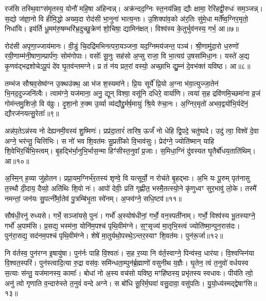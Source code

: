 रज॑सि तस्थि॒वाꣳस॑मृ॒तस्य॒ योनौ॑ महि॒षा अ॑हिन्वन्न्। अक्र॑न्दद॒ग्निः स्त॒नय॑न्निव॒ द्यौः क्षामा॒ रेरि॑हद्वी॒रुधः॑ सम॒ञ्जन्न्। स॒द्यो ज॑ज्ञा॒नो वि हीमि॒द्धो अख्य॒दा रोद॑सी भा॒नुना॑ भात्य॒न्तः। उ॒शिक्पा॑व॒को अ॑र॒तिः सु॑मे॒धा मर्ते᳚ष्व॒ग्निर॒मृतो॒ निधा॑यि। इय॑र्ति धू॒मम॑रु॒षम्भरि॑भ्र॒दुच्छु॒क्रेण॑ शो॒चिषा॒ द्यामिन॑क्षत्। विश्व॑स्य के॒तुर्भुव॑नस्य॒ गर्भ॒ आ॥७॥

रोद॑सी अपृणा॒ज्जाय॑मानः। वी॒डुं चि॒दद्रि॑मभिनत्परा॒यञ्जना॒ यद॒ग्निमय॑जन्त॒ पञ्च॑। श्री॒णामु॑दा॒रो ध॒रुणो॑ रयी॒णाम्म॑नी॒षाणा॒म्प्रार्प॑णः॒ सोम॑गोपाः। वसोः᳚ सू॒नुः सह॑सो अ॒प्सु राजा॒ वि भा॒त्यग्र॑ उ॒षसा॑मिधा॒नः। यस्ते॑ अ॒द्य कृ॒णव॑द्भद्रशोचे\-ऽपू॒पं दे॑व घृ॒तव॑न्तमग्ने। प्र तं न॑य प्रत॒रां वस्यो॒ अच्छा॒भि द्यु॒म्नं दे॒वभ॑क्तं यविष्ठ। आ॥८॥

तम्भ॑ज सौश्रव॒सेष्व॑ग्न उ॒क्थउ॑क्थ॒ आ भ॑ज श॒स्यमा॑ने। प्रि॒यः सूर्ये᳚ प्रि॒यो अ॒ग्ना भ॑वा॒त्युज्जा॒तेन॑ भि॒नद॒दुज्जनि॑त्वैः। त्वाम॑ग्ने॒ यज॑माना॒ अनु॒ द्यून् विश्वा॒ वसू॑नि दधिरे॒ वार्या॑णि। त्वया॑ स॒ह द्रवि॑णमि॒च्छमा॑ना व्र॒जं गोम॑न्तमु॒शिजो॒ वि व॑व्रुः। दृ॒शा॒नो रु॒क्म उ॒र्व्या व्य॑द्यौद्दु॒र्मर्\mbox{}ष॒मायुः॑ श्रि॒ये रु॑चा॒नः। अ॒ग्निर॒मृतो॑ अभव॒द्वयो॑भि॒र्यदे॑नं॒ द्यौरज॑नयत्सु॒रेताः᳚॥९॥

{\anuvakamend[{तृ॒तीये᳚ त्वा॒ गर्भ॒ आ य॑वि॒ष्ठा यच्च॒त्वारि॑ च॥२॥}]}

अन्न॑प॒ते\-ऽन्न॑स्य नो देह्यनमी॒वस्य॑ शु॒ष्मिणः॑। प्रप्र॑दा॒तारं॑ तारिष॒ ऊर्जं॑ नो धेहि द्वि॒पदे॒ चतु॑ष्पदे। उदु॑ त्वा॒ विश्वे॑ दे॒वा अग्ने॒ भर॑न्तु॒ चित्ति॑भिः। स नो॑ भव शि॒वत॑मः सु॒प्रती॑को वि॒भाव॑सुः। प्रेद॑ग्ने॒ ज्योति॑ष्मान् याहि शि॒वेभि॑र॒र्चिभि॒स्त्वम्। बृ॒हद्भि॑र्भा॒नुभि॒र्भास॒न्मा हिꣳ॑सीस्त॒नुवा᳚ प्र॒जाः। स॒मिधा॒ग्निं दु॑वस्यत घृ॒तैर्बो॑धय॒ताति॑थिम्। आ॥१०॥

अ॒स्मि॒न् ह॒व्या जु॑होतन। प्रप्रा॒यम॒ग्निर्भ॑र॒तस्य॑ शृण्वे॒ वि यत्सूर्यो॒ न रोच॑ते बृ॒हद्भाः। अ॒भि यः पू॒रुम् पृत॑नासु त॒स्थौ दी॒दाय॒ दैव्यो॒ अति॑थिः शि॒वो नः॑। आपो॑ देवीः॒ प्रति॑ गृह्णीत॒ भस्मै॒तत्स्यो॒ने कृ॑णुध्वꣳ सुर॒भावु॑ लो॒के। तस्मै॑ नमन्तां॒ जन॑यः सु॒पत्नी᳚र्मा॒तेव॑ पु॒त्रम्बि॑भृ॒ता स्वे॑नम्। अ॒प्स्व॑ग्ने॒ सधि॒ष्टव॑॥११॥

सौष॑धी॒रनु॑ रुध्यसे। गर्भे॒ सञ्जा॑यसे॒ पुनः॑। गर्भो॑ अ॒स्योष॑धीनां॒ गर्भो॒ वन॒स्पती॑नाम्। गर्भो॒ विश्व॑स्य भू॒तस्याग्ने॒ गर्भो॑ अ॒पाम॑सि। प्र॒सद्य॒ भस्म॑ना॒ योनि॑म॒पश्च॑ पृथि॒वीम॑ग्ने। स॒ꣳ॒सृज्य॑ मा॒तृभि॒स्त्वं ज्योति॑ष्मा॒न्पुन॒रास॑दः। पुन॑रा॒सद्य॒ सद॑नम॒पश्च॑ पृथि॒वीम॑ग्ने। शेषे॑ मा॒तुर्यथो॒पस्थे॒\-ऽन्तर॒स्याꣳ शि॒वत॑मः। पुन॑रू॒र्जा॥१२॥

नि व॑र्तस्व॒ पुन॑रग्न इ॒षायु॑षा। पुन॑र्नः पाहि वि॒श्वतः॑। स॒ह र॒य्या नि व॑र्त॒स्वाग्ने॒ पिन्व॑स्व॒ धार॑या। वि॒श्वप्स्नि॑या वि॒श्वत॒स्परि॑। पुन॑स्त्वादि॒त्या रु॒द्रा वस॑वः॒ समि॑न्धता॒म्पुन॑र्ब्र॒ह्माणो॑ वसुनीथ य॒ज्ञैः। घृ॒तेन॒ त्वं त॒नुवो॑ वर्धयस्व स॒त्याः स॑न्तु॒ यज॑मानस्य॒ कामाः᳚। बोधा॑ नो अ॒स्य वच॑सो यविष्ठ॒ मꣳहि॑ष्ठस्य॒ प्रभृ॑तस्य स्वधावः। पीय॑ति त्वो॒ अनु॑ त्वो गृणाति व॒न्दारु॑स्ते त॒नुवं॑ वन्दे अग्ने। स बो॑धि सू॒रिर्म॒घवा॑ वसु॒दावा॒ वसु॑पतिः। यु॒यो॒ध्य॑स्मद्द्वेषाꣳ॑सि॥१३॥

